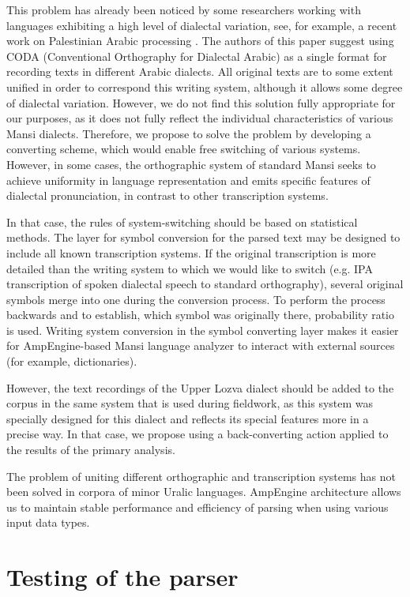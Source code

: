 \documentclass[b5paper,notitlepage]{article}
\begin{document}
This problem has already been noticed by some researchers working with languages exhibiting a high level of dialectal variation, see, for example, a recent work on Palestinian Arabic processing \cite{Araby}. The authors of this paper suggest using CODA (Conventional Orthography for Dialectal Arabic) as a single format for recording texts in different Arabic dialects. All original texts are to some extent unified in order to correspond this writing system, although it allows some degree of dialectal variation. However, we do not find this solution fully appropriate for our purposes, as it does not fully reflect the individual characteristics of various Mansi dialects. Therefore, we propose to solve the problem by developing a converting scheme, which would enable free switching of various systems.
However, in some cases, the orthographic system of standard Mansi seeks to achieve uniformity in language representation and emits specific features of dialectal pronunciation, in contrast to other transcription systems.

In that case, the rules of system-switching should be based on statistical methods. The layer for symbol conversion for the parsed text may be designed to include all known transcription systems. If the original transcription is more detailed than the writing system to which we would like to switch (e.g. IPA transcription of spoken dialectal speech to standard orthography), several original symbols merge into one during the conversion process. To perform the process backwards and to establish, which symbol was originally there, probability ratio is used. 
Writing system conversion in the symbol converting layer makes it easier for AmpEngine-based Mansi language analyzer to interact with external sources (for example, dictionaries).

However, the text recordings of the Upper Lozva dialect should be added to the corpus in the same system that is used during fieldwork, as this system was specially designed for this dialect and reflects its special features more in a precise way. In that case, we propose using a back-converting action applied to the results of the primary analysis.

The problem of uniting different orthographic and transcription systems has not been solved in corpora of minor Uralic languages. AmpEngine architecture allows us to maintain stable performance and efficiency of parsing when using various input data types.  

\section{Testing of the parser}
\end{document}
